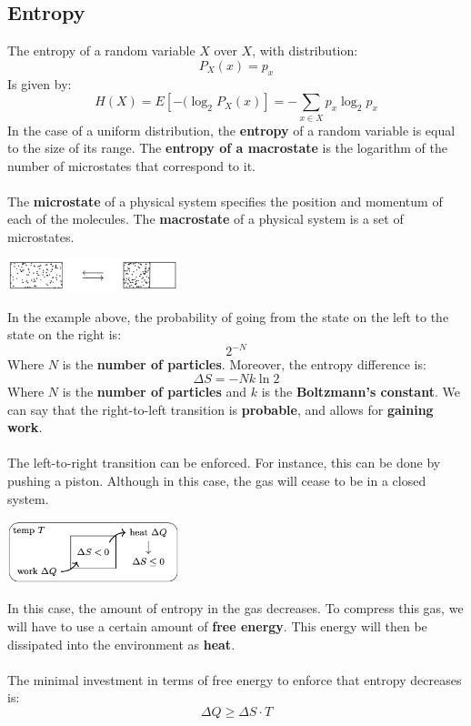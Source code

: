 \documentclass{article}
\begin{document}
\subsection{Entropy}
The entropy of a random variable $X$ over $X$, with distribution:
\[ P_X(x) = p_x \]
Is given by:
\[ H(X) = E[-(\log_2 P_X(x)] = - \sum_{x \in X} p_x \log_2p_x \]
In the case of a uniform distribution, the \textbf{entropy} of a random variable is equal to the size of its range. The \textbf{entropy of a macrostate} is the logarithm of the number of microstates that correspond to it. \\ \\
The \textbf{microstate} of a physical system specifies the position and momentum of each of the molecules. The \textbf{macrostate} of a physical system is a set of microstates.
\begin{center}
	\includegraphics[width=5cm]{assets/entropy.png}
\end{center}
In the example above, the probability of going from the state on the left to the state on the right is:
\[ 2^{-N} \]
Where $N$ is the \textbf{number of particles}. Moreover, the entropy difference is:
\[ \Delta S = -Nk \ln 2 \]
Where $N$ is the \textbf{number of particles} and $k$ is the \textbf{Boltzmann's constant}. We can say that the right-to-left transition is \textbf{probable}, and allows for \textbf{gaining work}. \\ \\
The left-to-right transition can be enforced. For instance, this can be done by pushing a piston. Although in this case, the gas will cease to be in a closed system. 
\begin{center}
	\includegraphics[width=5cm]{assets/piston.png}
\end{center}
In this case, the amount of entropy in the gas decreases. To compress this gas, we will have to use a certain amount of \textbf{free energy}. This energy will then be dissipated into the environment as \textbf{heat}. \\ \\
The minimal investment in terms of free energy to enforce that entropy decreases is:
\[ \Delta Q \geq \Delta S \cdot T \]
\end{document}
